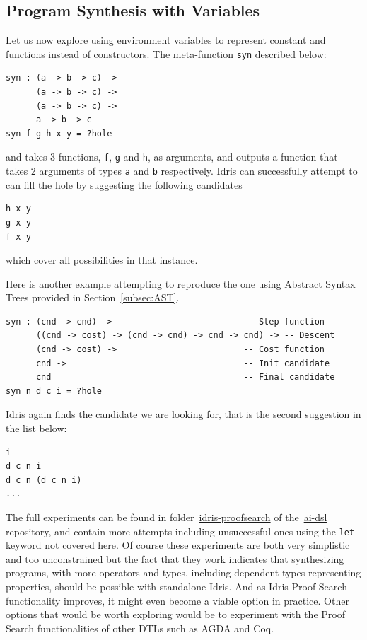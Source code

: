 \documentclass[]{report}
\begin{document}
\subsection{Program Synthesis with Variables}
Let us now explore using environment variables to represent constant
and functions instead of constructors.  The meta-function \texttt{syn}
described below:
\begin{verbatim}
syn : (a -> b -> c) ->
      (a -> b -> c) ->
      (a -> b -> c) ->
      a -> b -> c
syn f g h x y = ?hole
\end{verbatim}
and takes 3 functions, \texttt{f}, \texttt{g} and \texttt{h}, as
arguments, and outputs a function that takes 2 arguments of types
\texttt{a} and \texttt{b} respectively.  Idris can successfully
attempt to can fill the hole by suggesting the following candidates
\begin{verbatim}
h x y
g x y
f x y
\end{verbatim}
which cover all possibilities in that instance.

Here is another example attempting to reproduce the one using Abstract
Syntax Trees provided in Section~\ref{subsec:AST}.
\begin{verbatim}
syn : (cnd -> cnd) ->                          -- Step function
      ((cnd -> cost) -> (cnd -> cnd) -> cnd -> cnd) -> -- Descent
      (cnd -> cost) ->                         -- Cost function
      cnd ->                                   -- Init candidate
      cnd                                      -- Final candidate
syn n d c i = ?hole
\end{verbatim}
Idris again finds the candidate we are looking for, that is the second
suggestion in the list below:
\begin{verbatim}
i
d c n i
d c n (d c n i)
...
\end{verbatim}

The full experiments can be found in folder~\href{https://github.com/singnet/ai-dsl/blob/master/experimental/program-synthesis/idris-proofsearch}{idris-proofsearch}
of the~\href{https://github.com/singnet/ai-dsl}{ai-dsl} repository,
and contain more attempts including unsuccessful ones using the
\texttt{let} keyword not covered here.  Of course these experiments
are both very simplistic and too unconstrained but the fact that they
work indicates that synthesizing programs, with more operators and
types, including dependent types representing properties, should be
possible with standalone Idris.  And as Idris Proof Search
functionality improves, it might even become a viable option in
practice.  Other options that would be worth exploring would be to
experiment with the Proof Search functionalities of other DTLs such as
AGDA and Coq.
\end{document}
